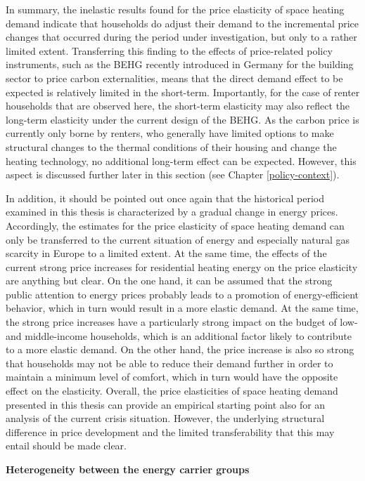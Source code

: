 \documentclass[12pt,twoside]{reedthesis}
\begin{document}
In summary, the inelastic results found for the price elasticity of space heating demand indicate that households do adjust their demand to the incremental price changes that occurred during the period under investigation, but only to a rather limited extent. Transferring this finding to the effects of price-related policy instruments, such as the BEHG recently introduced in Germany for the building sector to price carbon externalities, means that the direct demand effect to be expected is relatively limited in the short-term. Importantly, for the case of renter households that are observed here, the short-term elasticity may also reflect the long-term elasticity under the current design of the BEHG. As the carbon price is currently only borne by renters, who generally have limited options to make structural changes to the thermal conditions of their housing and change the heating technology, no additional long-term effect can be expected. However, this aspect is discussed further later in this section (see Chapter \ref{policy-context}).

In addition, it should be pointed out once again that the historical period examined in this thesis is characterized by a gradual change in energy prices. Accordingly, the estimates for the price elasticity of space heating demand can only be transferred to the current situation of energy and especially natural gas scarcity in Europe to a limited extent. At the same time, the effects of the current strong price increases for residential heating energy on the price elasticity are anything but clear. On the one hand, it can be assumed that the strong public attention to energy prices probably leads to a promotion of energy-efficient behavior, which in turn would result in a more elastic demand. At the same time, the strong price increases have a particularly strong impact on the budget of low- and middle-income households, which is an additional factor likely to contribute to a more elastic demand. On the other hand, the price increase is also so strong that households may not be able to reduce their demand further in order to maintain a minimum level of comfort, which in turn would have the opposite effect on the elasticity. Overall, the price elasticities of space heating demand presented in this thesis can provide an empirical starting point also for an analysis of the current crisis situation. However, the underlying structural difference in price development and the limited transferability that this may entail should be made clear.

\textbf{Heterogeneity between the energy carrier groups}
\end{document}
